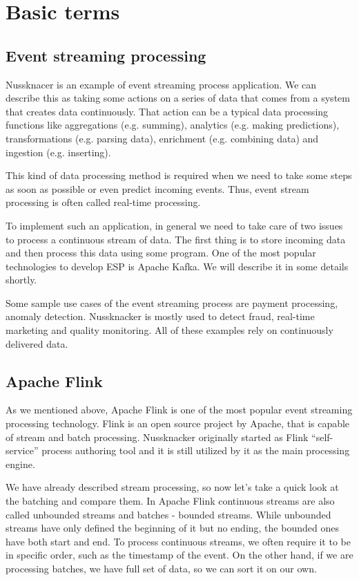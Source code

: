 \chapter{Basic terms}
\label{chap:basic}

\section{Event streaming processing}

Nussknacer is an example of event streaming process application.
We can describe this as taking some actions on a series of data that comes from a system that creates data continuously.
That action can be a typical data processing functions like aggregations (e.g. summing),
analytics (e.g. making predictions), transformations (e.g. parsing data), enrichment (e.g. combining data)
and ingestion (e.g. inserting).

This kind of data processing method is required when we need to take some steps as soon as possible or even predict incoming events.
Thus, event stream processing is often called real-time processing.

To implement such an application, in general we need to take care of two issues to process a continuous stream of data.
The first thing is to store incoming data and then process this data using some program.
One of the most popular technologies to develop ESP is Apache Kafka. We will describe it in some details shortly.

Some sample use cases of the event streaming process are payment processing, anomaly detection.
Nussknacker is mostly used to detect fraud, real-time marketing and quality monitoring.
All of these examples rely on continuously delivered data.\cite{esp}

\section{Apache Flink}

As we mentioned above, Apache Flink is one of the most popular event streaming processing technology.
Flink is an open source project by Apache, that is capable of stream and batch processing. Nussknacker originally started
as Flink “self-service” process authoring tool and it is still utilized by it as the main processing engine.

We have already described stream processing, so now let’s take a quick look at the batching and compare them.
In Apache Flink continuous streams are also called unbounded streams and batches -  bounded streams.
While unbounded streams have only defined the beginning of it but no ending, the bounded ones have both start and end.
To process continuous streams, we often require it to be in specific order, such as the timestamp of the event.
On the other hand, if we are processing batches, we have full set of data, so we can sort it on our own.

